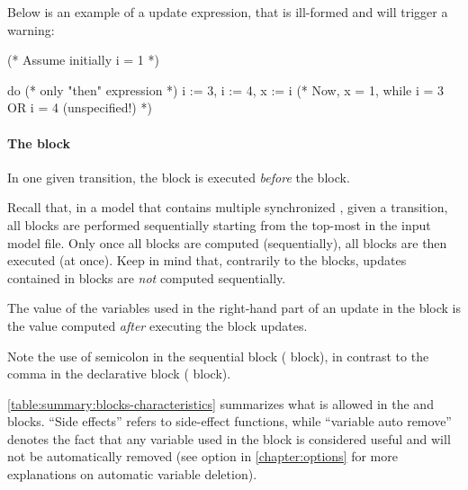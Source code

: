 Below is an example of a  update expression, that is ill-formed and will trigger a warning:

\begin{IMITATORmodel}
	(* Assume initially i = 1 *)

	do {
		(* only "then" expression *)
		i := 3,
		i := 4,
		x := i
	}
	(* Now, x = 1, while i = 3 OR i = 4 (unspecified!) *)
\end{IMITATORmodel}


\paragraph{The  block}

In one given transition, the  block is executed \emph{before} the  block.

Recall that, in a model that contains multiple synchronized \IPTA{}, given a transition, all  blocks are performed sequentially starting from the top-most \IPTA{} in the input model file.
Only once all  blocks are computed (sequentially), all  blocks are then executed (at once).
Keep in mind that, contrarily to the  blocks, updates contained in  blocks are \emph{not} computed sequentially.

The value of the variables used in the right-hand part of an update in the  block is the value computed \emph{after} executing the  block updates.



\begin{remark}
	Note the use of semicolon in the sequential block ( block), in contrast to the comma in the declarative block ( block).
\end{remark}

\cref{table:summary:blocks-characteristics} summarizes what is allowed in the  and  blocks.
``Side effects'' refers to side-effect functions, while ``variable auto remove'' denotes the fact that any variable used in the  block is considered useful and will not be automatically removed (see option  in \cref{chapter:options} for more explanations on \imitator{} automatic variable deletion).


